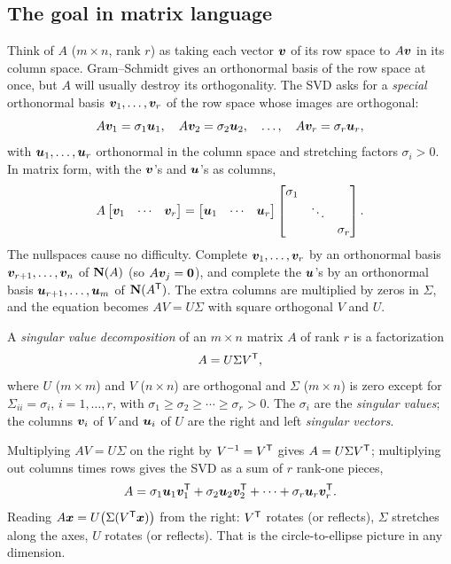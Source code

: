 \subsection{The goal in matrix language}

Think of $A$ ($m\times n$, rank $r$) as taking each vector $\boldsymbol{v}$ of its row space to $A\boldsymbol{v}$ in its
column space. Gram--Schmidt gives an orthonormal basis of the row space at once, but $A$ will
usually destroy its orthogonality. The SVD asks for a \emph{special} orthonormal basis
$\boldsymbol{v}_1,\dots,\boldsymbol{v}_r$ of the row space whose images are orthogonal:
\[
  A\boldsymbol{v}_1=\sigma_1\boldsymbol{u}_1,\quad A\boldsymbol{v}_2=\sigma_2\boldsymbol{u}_2,\quad\dots,\quad A\boldsymbol{v}_r=\sigma_r\boldsymbol{u}_r,
\]
with $\boldsymbol{u}_1,\dots,\boldsymbol{u}_r$ orthonormal in the column space and stretching factors $\sigma_i>0$. In
matrix form, with the $\boldsymbol{v}$'s and $\boldsymbol{u}$'s as columns,
\[
  A\begin{bmatrix}\boldsymbol{v}_1&\cdots&\boldsymbol{v}_r\end{bmatrix}
  =\begin{bmatrix}\boldsymbol{u}_1&\cdots&\boldsymbol{u}_r\end{bmatrix}
  \begin{bmatrix}\sigma_1&&\\&\ddots&\\&&\sigma_r\end{bmatrix}.
\]
The nullspaces cause no difficulty. Complete $\boldsymbol{v}_1,\dots,\boldsymbol{v}_r$ by an orthonormal basis
$\boldsymbol{v}_{r+1},\dots,\boldsymbol{v}_n$ of $\mathbf{N}(A)$ (so $A\boldsymbol{v}_j=\boldsymbol{0}$), and complete the $\boldsymbol{u}$'s by an orthonormal
basis $\boldsymbol{u}_{r+1},\dots,\boldsymbol{u}_m$ of $\mathbf{N}(A^{\mathsf{T}})$. The extra columns are multiplied by zeros in $\Sigma$, and
the equation becomes $AV=U\Sigma$ with square orthogonal $V$ and $U$.

\begin{definition}\label{def:u33-svd}
A \emph{singular value decomposition} of an $m\times n$ matrix $A$ of rank $r$ is a factorization
\[
  A=U\Sigma V^{\mathsf{T}} ,
\]
where $U$ ($m\times m$) and $V$ ($n\times n$) are orthogonal and $\Sigma$ ($m\times n$) is zero except for
$\Sigma_{ii}=\sigma_i$, $i=1,\dots,r$, with $\sigma_1\ge\sigma_2\ge\cdots\ge\sigma_r>0$. The $\sigma_i$ are the
\emph{singular values}; the columns $\boldsymbol{v}_i$ of $V$ and $\boldsymbol{u}_i$ of $U$ are the right and left
\emph{singular vectors}.
\end{definition}

Multiplying $AV=U\Sigma$ on the right by $V^{-1}=V^{\mathsf{T}}$ gives $A=U\Sigma V^{\mathsf{T}}$; multiplying out columns
times rows gives the SVD as a sum of $r$ rank-one pieces,
\[
  A=\sigma_1\boldsymbol{u}_1\boldsymbol{v}_1^{\mathsf{T}}+\sigma_2\boldsymbol{u}_2\boldsymbol{v}_2^{\mathsf{T}}+\cdots+\sigma_r\boldsymbol{u}_r\boldsymbol{v}_r^{\mathsf{T}} .
\]
Reading $A\boldsymbol{x}=U\bigl(\Sigma(V^{\mathsf{T}}\boldsymbol{x})\bigr)$ from the right: $V^{\mathsf{T}}$ rotates (or reflects), $\Sigma$ stretches
along the axes, $U$ rotates (or reflects). That is the circle-to-ellipse picture in any dimension.

